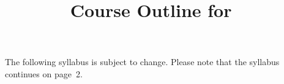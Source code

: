 \documentclass{article}
\title{Course Outline for \commonCourse\ \commonTerm}
\date{\commonDate}
\author{\commonAuthor}
\begin{document}
\maketitle
\thispagestyle{empty}

The following syllabus is subject to change.  Please note that the
syllabus continues on page~2.
\end{document}

